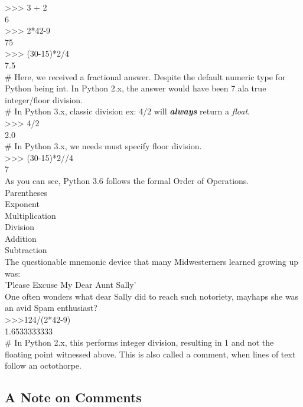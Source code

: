 \documentclass[oneside,12pt]{memoir} %
\begin{document}
{>}{>}{>} 3 + 2\\
6\\
{>}{>}{>} 2*42-9\\
75\\
{>}{>}{>} (30-15)*2/4\\
7.5\\

\# Here, we received a fractional answer. Despite the default numeric type for Python being int. In Python 2.x, the answer would have been 7 ala true integer/floor division.\\
\# In Python 3.x, classic division ex: 4/2 will \textbf{\emph{always}} return a \emph{float}.\\
{>}{>}{>} 4/2\\
2.0\\

\# In Python 3.x, we needs must specify floor division.\\
{>}{>}{>} (30-15)*2//4\\
7\\


As you can see, Python 3.6 follows the formal Order of Operations.\\
Parentheses\\
Exponent\\
Multiplication\\
Division\\
Addition\\
Subtraction\\

The questionable mnemonic device that many Midwesterners learned growing up was:\\

'Please Excuse My Dear Aunt Sally'\\

One often wonders what dear Sally did to reach such notoriety, mayhaps she was an avid Spam enthusiast?\\
{>}{>}{>}124/(2*42-9)\\
1.6533333333\\

\# In Python 2.x, this performs integer division, resulting in 1 and not the floating point witnessed above. This is also called a comment, when lines of text follow an octothorpe. \\



\subsection {A Note on Comments}
\label{comments}
\end{document}
